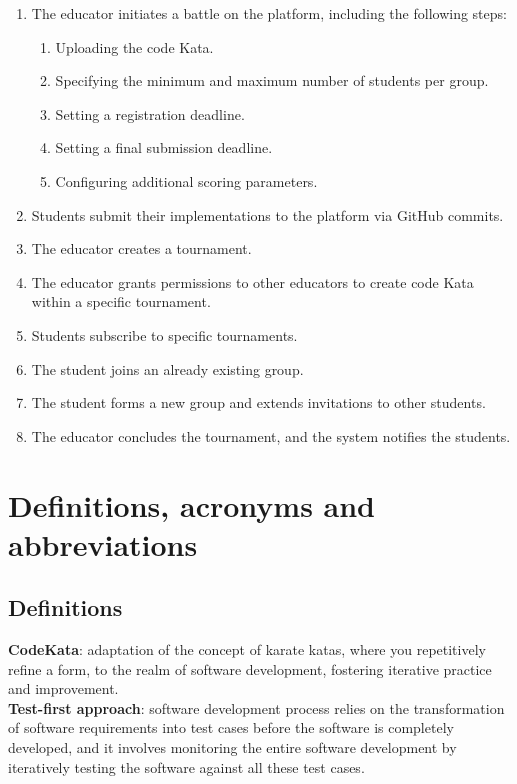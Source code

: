 \documentclass[12pt, a4paper]{report}
\begin{document}
    \begin{enumerate}
        \item The educator initiates a battle on the platform, including the following steps:
            \begin{enumerate}
                \item Uploading the code Kata.
                \item Specifying the minimum and maximum number of students per group.
                \item Setting a registration deadline.
                \item Setting a final submission deadline.
                \item Configuring additional scoring parameters.
            \end{enumerate}
        \item Students submit their implementations to the platform via GitHub commits.
        \item The educator creates a tournament.
        \item The educator grants permissions to other educators to create code Kata within a specific tournament.
        \item Students subscribe to specific tournaments.
        \item The student joins an already existing group.
        \item The student forms a new group and extends invitations to other students.
        \item The educator concludes the tournament, and the system notifies the students.
    \end{enumerate}

    \section{Definitions, acronyms and abbreviations}

    \subsection{Definitions}
    \textbf{CodeKata}: adaptation of the concept of karate katas, where you repetitively refine a form, to the realm of software development, fostering iterative practice and improvement. \\
    \textbf{Test-first approach}: software development process relies on the transformation of software requirements into test cases before the software is completely developed, and it involves monitoring the entire software development by iteratively testing the software against all these test cases.
    
\end{document}
